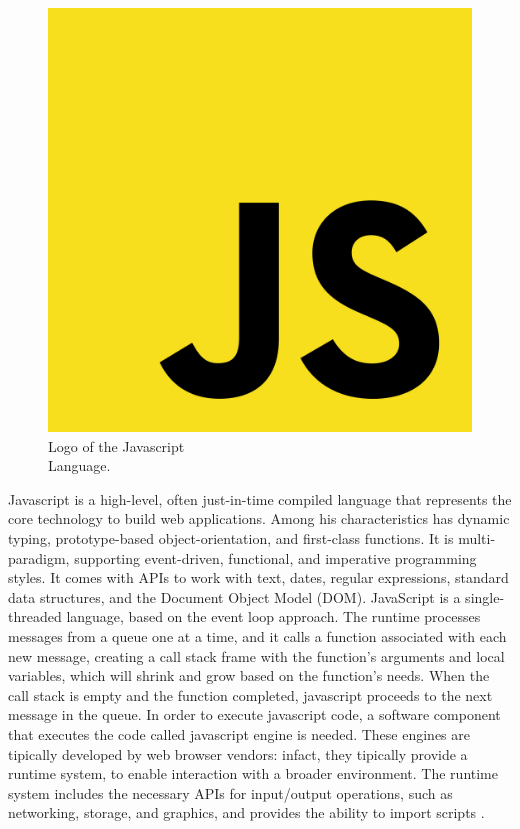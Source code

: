 \begin{figure} %
    \captionsetup{font=footnotesize}
    \centering
    \includegraphics[width=\linewidth]{images/javascript.png}
    \caption{Logo of the Javascript\\Language.}
\end{figure}

Javascript is a high-level, often just-in-time compiled language that represents the core technology to build web applications. Among his characteristics has dynamic typing, prototype-based object-orientation, and first-class functions. It is multi-paradigm, supporting event-driven, functional, and imperative programming styles. It comes with APIs to work with text, dates, regular expressions, standard data structures, and the Document Object Model (DOM). JavaScript is a single-threaded language, based on the event loop approach. The runtime processes messages from a queue one at a time, and it calls a function associated with each new message, creating a call stack frame with the function's arguments and local variables, which will shrink and grow based on the function's needs. When the call stack is empty and the function completed, javascript proceeds to the next message in the queue. In order to execute javascript code, a software component that executes the code called javascript engine is needed. These engines are tipically developed by web browser vendors: infact, they tipically provide a runtime system, to enable interaction with a broader environment. The runtime system includes the necessary APIs for input/output operations, such as networking, storage, and graphics, and provides the ability to import scripts \cite{Javascript}.

